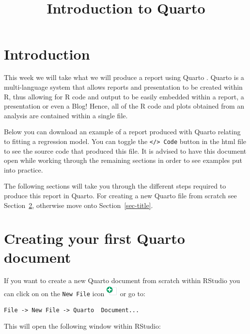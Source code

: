 \documentclass[
  letterpaper,
  DIV=11,
  numbers=noendperiod]{scrartcl}
\title{Introduction to Quarto}
\author{}
\date{}
\makeatletter
\renewcommand{\maketitle}{\bgroup\setlength{\parindent}{0pt}
\begin{flushleft}
  {\color{uniblue}\sffamily\huge\textbf{\@title}} \vspace{0.3cm} \newline
  {\Large {\@subtitle}} \newline
  \@author
\end{flushleft}\egroup
}
\renewcommand*\contentsname{Table of contents}
\newcommand\contentsname{Table of contents}
\makeatother
\begin{document}
\maketitle

\pagestyle{mystyle}

\renewcommand*\contentsname{Contents}
{
\hypersetup{linkcolor=}
\setcounter{tocdepth}{3}
\tableofcontents
}
\section{Introduction}\label{introduction}

This week we will take what we will produce a report using Quarto .
Quarto is a multi-language system that allows reports and presentation
to be created within R, thus allowing for R code and output to be easily
embedded within a report, a presentation or even a Blog! Hence, all of
the R code and plots obtained from an analysis are contained within a
single file.

Below you can download an example of a report produced with Quarto
relating to fitting a regression model. You can toggle the
\texttt{\textless{}/\textgreater{}\ Code} button in the html file to see
the source code that produced this file. It is advised to have this
document open while working through the remaining sections in order to
see examples put into practice.

The following sections will take you through the different steps
required to produce this report in Quarto. For creating a new Quarto
file from scratch see Section~\ref{sec-quarto_init}, otherwise move onto
Section~\ref{sec-title}.

\section{Creating your first Quarto document}\label{sec-quarto_init}

If you want to create a new Quarto document from scratch within RStudio
you can click on on the \texttt{New\ File} icon
\includegraphics[width=0.23958in,height=\textheight]{images/new_doc.png}
or go to:

\texttt{File\ -\textgreater{}\ New\ File\ -\textgreater{}\ Quarto\ \ Document...}

This will open the following window within RStudio:
\end{document}
